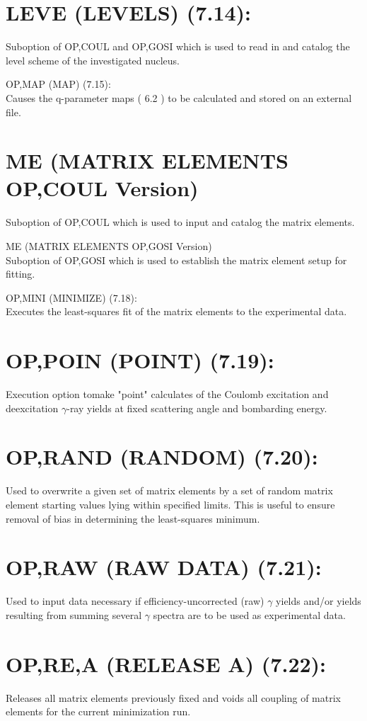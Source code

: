 \documentclass[10pt]{article}
\begin{document}
\section*{LEVE (LEVELS) (7.14):}
Suboption of OP,COUL and OP,GOSI which is used to read in and catalog the level scheme of the investigated nucleus.

OP,MAP (MAP) (7.15):\\
Causes the q-parameter maps ( 6.2 ) to be calculated and stored on an external file.

\section*{ME (MATRIX ELEMENTS OP,COUL Version)}
Suboption of OP,COUL which is used to input and catalog the matrix elements.

ME (MATRIX ELEMENTS OP,GOSI Version)\\
Suboption of OP,GOSI which is used to establish the matrix element setup for fitting.

OP,MINI (MINIMIZE) (7.18):\\
Executes the least-squares fit of the matrix elements to the experimental data.

\section*{OP,POIN (POINT) (7.19):}
Execution option tomake "point" calculates of the Coulomb excitation and deexcitation $\gamma$-ray yields at fixed scattering angle and bombarding energy.

\section*{OP,RAND (RANDOM) (7.20):}
Used to overwrite a given set of matrix elements by a set of random matrix element starting values lying within specified limits. This is useful to ensure removal of bias in determining the least-squares minimum.

\section*{OP,RAW (RAW DATA) (7.21):}
Used to input data necessary if efficiency-uncorrected (raw) $\gamma$ yields and/or yields resulting from summing several $\gamma$ spectra are to be used as experimental data.

\section*{OP,RE,A (RELEASE A) (7.22):}
Releases all matrix elements previously fixed and voids all coupling of matrix elements for the current minimization run.
\end{document}

